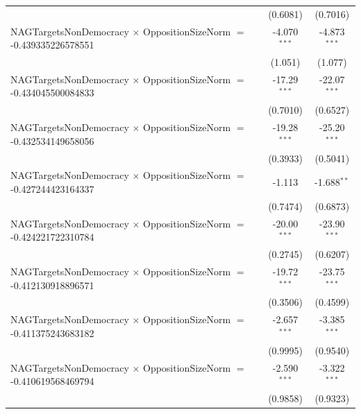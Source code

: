 \begin{tabular}{lcc}
                                                                                & (0.6081)             & (0.7016)\\   
   NAGTargetsNonDemocracy $\times$ OppositionSizeNorm $=$ -0.439335226578551    & -4.070$^{***}$       & -4.873$^{***}$\\   
                                                                                & (1.051)              & (1.077)\\   
   NAGTargetsNonDemocracy $\times$ OppositionSizeNorm $=$ -0.434045500084833    & -17.29$^{***}$       & -22.07$^{***}$\\   
                                                                                & (0.7010)             & (0.6527)\\   
   NAGTargetsNonDemocracy $\times$ OppositionSizeNorm $=$ -0.432534149658056    & -19.28$^{***}$       & -25.20$^{***}$\\   
                                                                                & (0.3933)             & (0.5041)\\   
   NAGTargetsNonDemocracy $\times$ OppositionSizeNorm $=$ -0.427244423164337    & -1.113               & -1.688$^{**}$\\   
                                                                                & (0.7474)             & (0.6873)\\   
   NAGTargetsNonDemocracy $\times$ OppositionSizeNorm $=$ -0.424221722310784    & -20.00$^{***}$       & -23.90$^{***}$\\   
                                                                                & (0.2745)             & (0.6207)\\   
   NAGTargetsNonDemocracy $\times$ OppositionSizeNorm $=$ -0.412130918896571    & -19.72$^{***}$       & -23.75$^{***}$\\   
                                                                                & (0.3506)             & (0.4599)\\   
   NAGTargetsNonDemocracy $\times$ OppositionSizeNorm $=$ -0.411375243683182    & -2.657$^{***}$       & -3.385$^{***}$\\   
                                                                                & (0.9995)             & (0.9540)\\   
   NAGTargetsNonDemocracy $\times$ OppositionSizeNorm $=$ -0.410619568469794    & -2.590$^{***}$       & -3.322$^{***}$\\   
                                                                                & (0.9858)             & (0.9323)\\   

\end{tabular}
